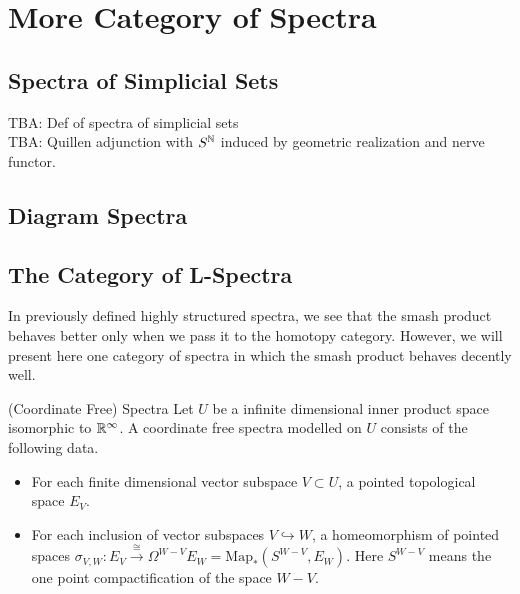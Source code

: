 \documentclass[a4paper]{article}
\begin{document}
\pagebreak
\section{More Category of Spectra}
\subsection{Spectra of Simplicial Sets}
TBA: Def of spectra of simplicial sets\\
TBA: Quillen adjunction with $S^{\mathbb{N}}$ induced by geometric realization and nerve functor. 

\subsection{Diagram Spectra}

\subsection{The Category of L-Spectra}
In previously defined highly structured spectra, we see that the smash product behaves better only when we pass it to the homotopy category. However, we will present here one category of spectra in which the smash product behaves decently well. 

\begin{defn}{(Coordinate Free) Spectra}{} Let $U$ be a infinite dimensional inner product space isomorphic to $\mathbb{R}^\infty$. A coordinate free spectra modelled on $U$ consists of the following data. 
\begin{itemize}
\item For each finite dimensional vector subspace $V\subset U$, a pointed topological space $E_V$. 
\item For each inclusion of vector subspaces $V\hookrightarrow W$, a homeomorphism of pointed spaces $\sigma_{V,W}:E_V\overset{\cong}{\rightarrow}\Omega^{W-V}E_W=\text{Map}_\ast(S^{W-V},E_W)$. Here $S^{W-V}$ means the one point compactification of the space $W-V$. 
\end{itemize}
\end{defn}
\end{document}
